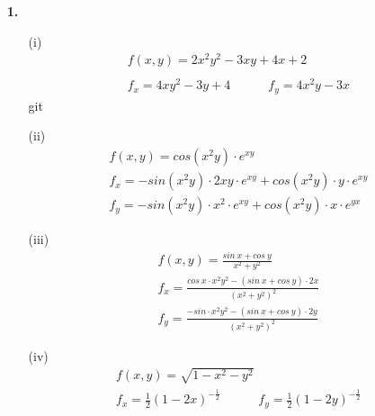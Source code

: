 \documentclass[a4paper,11pt]{article}
\title{\titleinfo}
\author{\authorinfotitle}
\date{\today}
\begin{document}
\maketitle
    \begin{enumerate}
        \item[\textbf{1.}]
        \begin{enumerate}
        	\item[(i)]
        	\begin{align*}
        &f(x,y) = 2x^2y^2-3xy+4x+2 \\ \\
        &f_x = 4xy^2 -3y + 4 \qquad \quad
        f_y = 4x^2y - 3x 
        	\end{align*}git 

        	\item[(ii)]
        	\begin{align*}
        &f(x,y) = cos(x^2y) \cdot e^{xy} \\[0.4cm]
        &f_x = -sin(x^2 y) \cdot 2xy \cdot e^{xy} + cos(x^2y) \cdot y \cdot e^{xy} \\[0.2cm]
        &f_y = -sin(x^2 y) \cdot x^2 \cdot e^{xy} + cos(x^2y) \cdot x \cdot e^{yx}	    
        	\end{align*}
       
        	\item[(iii)]
        	\begin{align*}
        &f(x,y) = \frac{sin \ x + cos \ y}{x^2 +y^2} \\[0.4cm]
        &f_x = \frac{cos \ x \cdot x^2y^2 - (sin \ x + cos \ y) \cdot 2x}{(x^2+y^2)^2} \\
        &f_y = \frac{-sin \cdot x^2y^2 - (sin \ x + cos \ y) \cdot 2y}{(x^2+y^2)^2} 
        	\end{align*}

        	\item[(iv)]
        	\begin{align*}
        &f(x,y) = \sqrt{1-x^2-y^2} \\[0.4cm]
       	&f_x = \frac{1}{2}(1-2x)^{-\frac{1}{2}} \qquad \quad
       	f_y = \frac{1}{2}(1-2y)^{-\frac{1}{2}} 
        	\end{align*}
       

        \end{enumerate}


\end{enumerate}
\end{document}
